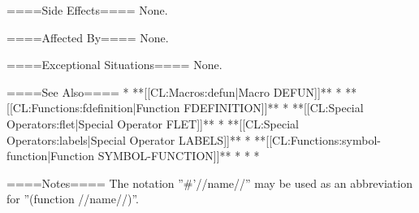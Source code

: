 ====Side Effects====
None.

====Affected By====
None.

====Exceptional Situations====
None.

====See Also====
  * **[[CL:Macros:defun|Macro DEFUN]]**
  * **[[CL:Functions:fdefinition|Function FDEFINITION]]**
  * **[[CL:Special Operators:flet|Special Operator FLET]]**
  * **[[CL:Special Operators:labels|Special Operator LABELS]]**
  * **[[CL:Functions:symbol-function|Function SYMBOL-FUNCTION]]**
  * {\secref\SymbolsAsForms}
  * {\secref\SharpsignQuote}
  * {\secref\PrintingOtherObjects}

====Notes====
The notation ''#'//name//'' may be used as an abbreviation for ''(function //name//)''.

 
